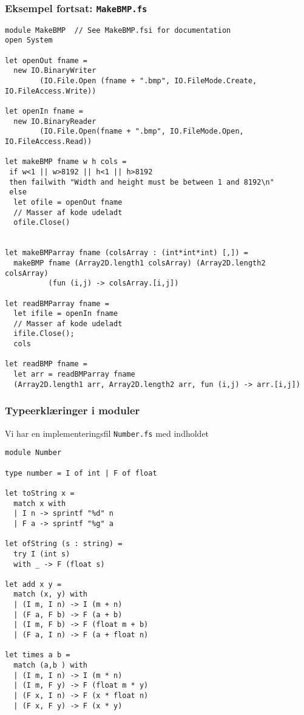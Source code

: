 \documentclass{beamer}
\begin{document}
\begin{frame}[fragile=singleslide]
\frametitle{Eksempel fortsat: \texttt{MakeBMP.fs}}

\renewcommand{\baselinestretch}{0.65}
{\scriptsize
\begin{verbatim}
module MakeBMP  // See MakeBMP.fsi for documentation
open System

let openOut fname =
  new IO.BinaryWriter
        (IO.File.Open (fname + ".bmp", IO.FileMode.Create, IO.FileAccess.Write))

let openIn fname =
  new IO.BinaryReader
        (IO.File.Open(fname + ".bmp", IO.FileMode.Open, IO.FileAccess.Read))

let makeBMP fname w h cols =
 if w<1 || w>8192 || h<1 || h>8192
 then failwith "Width and height must be between 1 and 8192\n"
 else
  let ofile = openOut fname
  // Masser af kode udeladt
  ofile.Close()


let makeBMParray fname (colsArray : (int*int*int) [,]) =
  makeBMP fname (Array2D.length1 colsArray) (Array2D.length2 colsArray)
          (fun (i,j) -> colsArray.[i,j])

let readBMParray fname =
  let ifile = openIn fname
  // Masser af kode udeladt
  ifile.Close();
  cols

let readBMP fname =
  let arr = readBMParray fname
  (Array2D.length1 arr, Array2D.length2 arr, fun (i,j) -> arr.[i,j])
\end{verbatim}
}
\renewcommand{\baselinestretch}{1.0}

\end{frame}

\begin{frame}[fragile=singleslide]
\frametitle{Typeerklæringer i moduler}

Vi har en implementeringsfil \texttt{Number.fs} med indholdet

\renewcommand{\baselinestretch}{0.7}
{\footnotesize
\begin{verbatim}
module Number

type number = I of int | F of float

let toString x =
  match x with
  | I n -> sprintf "%d" n
  | F a -> sprintf "%g" a

let ofString (s : string) =
  try I (int s)
  with _ -> F (float s)

let add x y =
  match (x, y) with
  | (I m, I n) -> I (m + n)
  | (F a, F b) -> F (a + b)
  | (I m, F b) -> F (float m + b)
  | (F a, I n) -> F (a + float n)

let times a b =
  match (a,b ) with
  | (I m, I n) -> I (m * n)
  | (I m, F y) -> F (float m * y)
  | (F x, I n) -> F (x * float n)
  | (F x, F y) -> F (x * y)
\end{verbatim}
}
\renewcommand{\baselinestretch}{1.0}

\end{frame}
\end{document}

